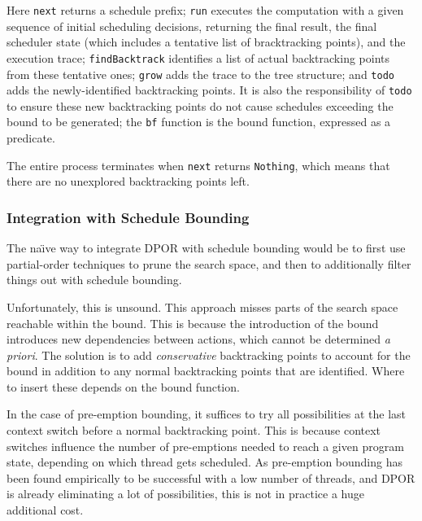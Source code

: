 
Here \verb|next| returns a schedule prefix; \verb|run| executes the
computation with a given sequence of initial scheduling decisions,
returning the final result, the final scheduler state (which includes
a tentative list of bracktracking points), and the execution trace;
\verb|findBacktrack| identifies a list of actual backtracking points
from these tentative ones; \verb|grow| adds the trace to the tree
structure; and \verb|todo| adds the newly-identified backtracking
points. It is also the responsibility of \verb|todo| to ensure these
new backtracking points do not cause schedules exceeding the bound to
be generated; the \verb|bf| function is the bound function, expressed
as a predicate.

The entire process terminates when \verb|next| returns \verb|Nothing|,
which means that there are no unexplored backtracking points left.

\subsubsection{Integration with Schedule Bounding}
\label{sec:sct-por-bounding}

The na\"{\i}ve way to integrate DPOR with schedule bounding would be
to first use partial-order techniques to prune the search space, and
then to additionally filter things out with schedule bounding.

Unfortunately, this is unsound. This approach misses parts of the
search space reachable within the bound. This is because the
introduction of the bound introduces new dependencies between actions,
which cannot be determined \emph{a priori}. The solution is to add
\emph{conservative} backtracking points to account for the bound in
addition to any normal backtracking points that are identified. Where
to insert these depends on the bound function.

In the case of pre-emption bounding, it suffices to try all
possibilities at the last context switch before a normal backtracking
point. This is because context switches influence the number of
pre-emptions needed to reach a given program state, depending on which
thread gets scheduled. As pre-emption bounding has been found
empirically to be successful with a low number of threads, and DPOR is
already eliminating a lot of possibilities, this is not in practice a
huge additional cost.

